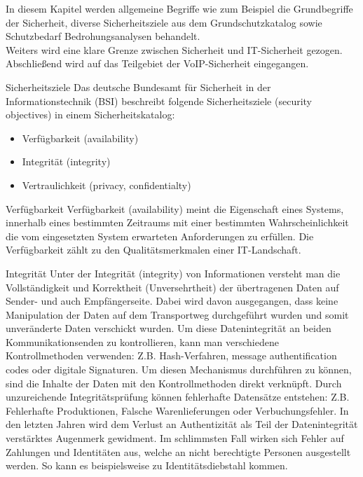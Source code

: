 \label{Grundlagen der IT-Sicherheit}
 In diesem Kapitel werden allgemeine Begriffe wie zum Beispiel die Grundbegriffe der
 Sicherheit, diverse Sicherheitsziele aus dem Grundschutzkatalog sowie Schutzbedarf 
 Bedrohungsanalysen behandelt. 
 \\
 Weiters wird eine klare Grenze zwischen Sicherheit und IT-Sicherheit gezogen. 
 Abschließend wird auf das Teilgebiet der VoIP-Sicherheit eingegangen.
 \\

 \label{Sicherheitsziele}
  \begin{section}{Sicherheitsziele}
  Das deutsche Bundesamt für Sicherheit in der Informationstechnik (BSI) beschreibt 
  folgende Sicherheitsziele (security objectives) in einem Sicherheitskatalog: 
  \cite{BSIBedarf}
  \begin{itemize}
   \item Verfügbarkeit (availability)
   \item Integrität (integrity)
   \item Vertraulichkeit (privacy, confidentialty)
  \end{itemize}
  \pagebreak
  
   \begin{subsection}{Verfügbarkeit}
    Verfügbarkeit (availability) meint die Eigenschaft eines Systems, innerhalb eines 
    bestimmten Zeitraums mit einer bestimmten Wahrscheinlichkeit die vom eingesetzten 
    System erwarteten Anforderungen zu erfüllen. Die Verfügbarkeit zählt zu den 
    Qualitätsmerkmalen einer IT-Landschaft.
    \\
   \end{subsection}

   \label{Integrität}
   \begin{subsection}{Integrität}
    Unter der Integrität (integrity) von Informationen versteht man die Vollständigkeit und 
    Korrektheit (Unversehrtheit) der übertragenen Daten auf Sender- und auch Empfängerseite. 
    Dabei wird davon ausgegangen, dass keine Manipulation der Daten auf dem Transportweg 
    durchgeführt wurden und somit unveränderte Daten verschickt wurden. Um diese 
    Datenintegrität an beiden Kommunikationsenden zu kontrollieren, kann man verschiedene 
    Kontrollmethoden verwenden: \ac{Z.B.} Hash-Verfahren, message authentification codes 
    oder digitale Signaturen. Um diesen Mechanismus durchführen zu können, sind die Inhalte 
    der Daten mit den Kontrollmethoden direkt verknüpft. 
    Durch unzureichende Integritätsprüfung können fehlerhafte Datensätze entstehen: Z.B. 
    Fehlerhafte Produktionen, Falsche Warenlieferungen oder Verbuchungsfehler. 
    In den letzten Jahren wird dem Verlust an Authentizität als Teil der Datenintegrität 
    verstärktes Augenmerk gewidment. 
    Im schlimmsten Fall wirken sich Fehler auf Zahlungen und Identitäten aus, welche an 
    nicht berechtigte Personen ausgestellt werden. So kann es beispielsweise zu 
    Identitätsdiebstahl kommen.
    \cite{BSIInfosi} \cite{BSIa} \cite{BSIBegriffe1}
    \\
   \end{subsection}


\end{section}

